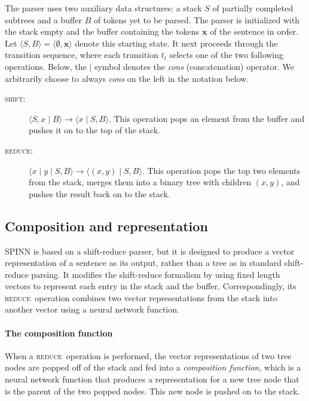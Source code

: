 \documentclass[11pt]{article}
\newcommand{\shift}{\textsc{shift}}
\newcommand{\reduce}{\textsc{reduce}}
\begin{document}
The parser uses two auxiliary data structures: a stack $S$ of partially completed subtrees and a buffer $B$ of tokens yet to be parsed. The parser is initialized with the stack empty and the buffer containing the tokens $\mathbf x$ of the sentence in order. Let $\langle S, B \rangle = \langle \emptyset, \mathbf x \rangle$ denote this starting state. It next proceeds through the transition sequence, where each transition $t_t$ selects one of the two following operations. Below, the $\mid$ symbol denotes the \textit{cons} (concatenation) operator. We arbitrarily choose to always \textit{cons} on the left in the notation below.
\vspace*{-1ex} %
\begin{description}
  \item[\shift:] $\langle S, x \mid B \rangle \to \langle x \mid S, B \rangle$. This operation pops an element from the buffer and pushes it on to the top of the stack.
\vspace*{-1ex}
  \item[\reduce:] $\langle x \mid y \mid S, B \rangle \to \langle (x, y) \mid S, B \rangle$. This operation pops the top two elements from the stack, merges them into a binary tree with children $(x, y)$, and pushes the result back on to the stack.
\end{description}

\subsection{Composition and representation}

SPINN is based on a shift-reduce parser, but it is designed to produce a vector representation of a sentence as its output, rather than a tree as in standard shift-reduce parsing. It modifies the shift-reduce formalism by using fixed length vectors to represent each entry in the stack and the buffer. Correspondingly, its \reduce\ operation combines two vector representations from the stack into another vector using a neural network function.

\paragraph{The composition function}
When a \reduce\ operation is performed, the vector representations of two tree nodes are popped off of the stack and fed into a {\it composition function}, which is a neural network function that produces a representation for a new tree node that is the parent of the two popped nodes. This new node is pushed on to the stack.
\end{document}
